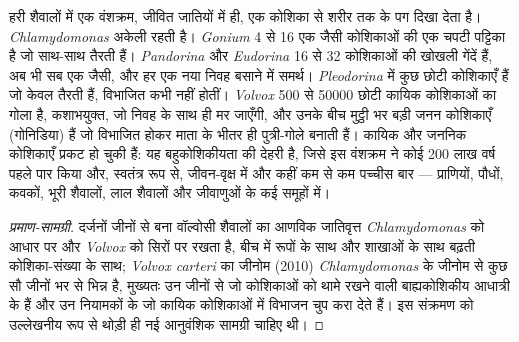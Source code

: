 \begin{proposition}[वॉल्वोसी शृंखला]\label{prop:b2:unicellular-diversity:volvox}
हरी शैवालों में एक वंशक्रम, जीवित जातियों में ही, एक कोशिका से शरीर तक के
पग दिखा देता है। \emph{Chlamydomonas} अकेली रहती है।
\emph{Gonium} 4 से 16 एक जैसी कोशिकाओं की एक चपटी पट्टिका है जो साथ-साथ
तैरती हैं। \emph{Pandorina} और \emph{Eudorina} 16 से 32 कोशिकाओं की खोखली
गेंदें हैं, अब भी सब एक जैसी, और हर एक नया निवह बसाने में समर्थ।
\emph{Pleodorina} में कुछ छोटी कोशिकाएँ हैं जो केवल तैरती हैं, विभाजित
कभी नहीं होतीं। \emph{Volvox} \num{500} से \num{50000} छोटी कायिक
कोशिकाओं का गोला है, कशाभयुक्त, जो निवह के साथ ही मर जाएँगी, और उनके बीच
मुट्ठी भर बड़ी जनन कोशिकाएँ (गोनिडिया) हैं जो विभाजित होकर माता के भीतर
ही पुत्री-गोले बनाती हैं। कायिक और जननिक कोशिकाएँ प्रकट हो चुकी हैं: यह
बहुकोशिकीयता की देहरी है, जिसे इस वंशक्रम ने कोई \num{200} लाख वर्ष पहले
पार किया और, स्वतंत्र रूप से, जीवन-वृक्ष में और कहीं कम से कम पच्चीस बार
--- प्राणियों, पौधों, कवकों, भूरी शैवालों, लाल शैवालों और जीवाणुओं के कई
समूहों में।
\end{proposition}
\begin{proof}[प्रमाण-सामग्री]
दर्जनों जीनों से बना वॉल्वोसी शैवालों का आणविक जातिवृत्त
\emph{Chlamydomonas} को आधार पर और \emph{Volvox} को सिरों पर रखता है,
बीच में  रूपों के साथ और शाखाओं के साथ बढ़ती कोशिका-संख्या के साथ;
\emph{Volvox carteri} का जीनोम (2010) \emph{Chlamydomonas} के जीनोम से
कुछ सौ जीनों भर से भिन्न है, मुख्यतः उन जीनों से जो कोशिकाओं को थामे
रखने वाली बाह्यकोशिकीय आधात्री के हैं और उन नियामकों के जो कायिक
कोशिकाओं में विभाजन चुप करा देते हैं। इस संक्रमण को उल्लेखनीय रूप से
थोड़ी ही नई आनुवंशिक सामग्री चाहिए थी।
\end{proof}

